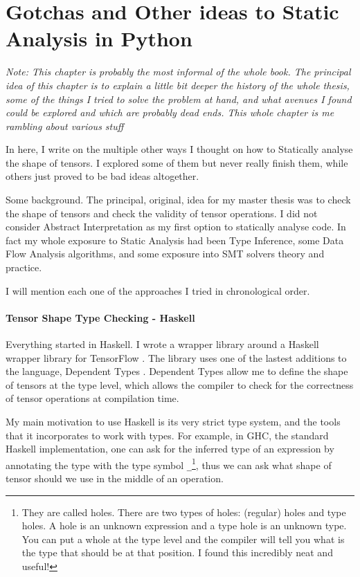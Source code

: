 \chapter{Gotchas and Other ideas to Static Analysis in Python}%
\label{gotchas-and-other-ideas-to-static-analysis-in-python}


\emph{\large Note: This chapter is probably the most informal of the whole
book. The principal idea of this chapter is to explain a little bit
deeper the history of the whole thesis, some of the things I tried to
solve the problem at hand, and what avenues I found could be explored
and which are probably dead ends. This whole chapter is me rambling
about various stuff}

In here, I write on the multiple other ways I thought on how to
Statically analyse the shape of tensors. I explored some of them but
never really finish them, while others just proved to be bad ideas
altogether.

Some background. The principal, original, idea for my master thesis was
to check the shape of tensors and check the validity of tensor
operations. I did not consider Abstract Interpretation as my first
option to statically analyse code. In fact my whole exposure to Static
Analysis had been Type Inference, some Data Flow Analysis algorithms,
and some exposure into SMT solvers theory and practice.

I will mention each one of the approaches I tried in chronological
order.

\subsubsection*{Tensor Shape Type Checking - Haskell}

Everything started in Haskell. I wrote a wrapper library around a
Haskell wrapper library for TensorFlow \autocite{abadi_tensorflow_2016}.
The library uses one of the lastest additions to the language, Dependent
Types \autocite{eisenberg_dependent_2016}. Dependent Types allow me to
define the shape of tensors at the type level, which allows the compiler
to check for the correctness of tensor operations at compilation time.

My main motivation to use Haskell is its very strict type system, and
the tools that it incorporates to work with types. For example, in GHC,
the standard Haskell implementation, one can ask for the inferred type
of an expression by annotating the type with the type symbol
\verb+_+\footnote{They are called holes. There are two types of
  holes: (regular) holes and type holes. A hole is an unknown expression
  and a type hole is an unknown type. You can put a whole at the type
  level and the compiler will tell you what is the type that should be
  at that position. I found this incredibly neat and useful!}, thus we
can ask what shape of tensor should we use in the middle of an
operation.

